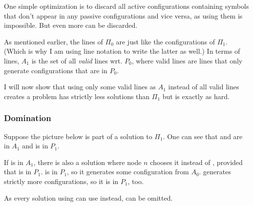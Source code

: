 \documentclass[english, 12pt, a4paper, sci, a-1b, online]{aaltothesis}
\begin{document}
One simple optimization is to discard all active configurations containing symbols that don't appear in any passive configurations and vice versa, as using them is impossible. But even more can be discarded.

As mentioned earlier, the lines of $\Pi_0$ are just like the configurations of $\Pi_1$. (Which is why I am using line notation to write the latter as well.) In terms of lines, $A_1$ is the set of all \emph{valid} lines wrt. $P_0$, where valid lines are lines that only generate configurations that are in $P_0$.

I will now show that using only some valid lines as $A_1$ instead of all valid lines creates a problem has strictly less solutions than $\Pi_1$ but is exactly as hard.

\subsubsection{Domination}

Suppose the picture below is part of a solution to $\Pi_{1}$. One can see that  and  are in $A_{1}$ and  is in $P_{1}$.


If  is in $A_{1}$, there is also a solution where node $n$ chooses it instead of , provided that  is in $P_{1}$.  is in $P_{1}$, so it generates some configuration from $A_{0}$.  generates strictly more configurations, so it is in $P_{1}$, too.


As every solution using  can use  instead,  can be omitted.
\end{document}
